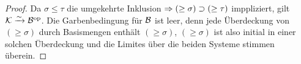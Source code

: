 \begin{proof}
   Da $\sigma \leq \tau$ die umgekehrte Inklusion $\Rightarrow (\geq
   \sigma) \supset (\geq \tau)$ imppliziert, gilt $\mathcal{K} \xrightarrow[]{\sim} \mathcal{B}^\mathrm{op}$. Die
   Garbenbedingung für $\mathcal{B}$ ist leer, denn jede Überdeckung von $(\geq
   \sigma)$ durch Basismengen enthält $(\geq \sigma)$, $(\geq \sigma)$
   ist also initial in einer solchen Überdeckung und die Limites über
   die beiden Systeme stimmen überein.
\end{proof}

